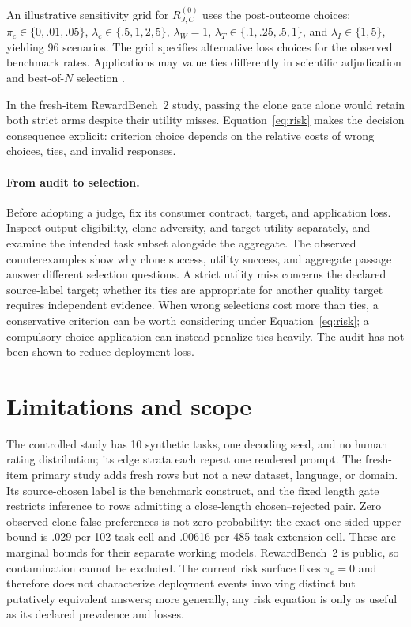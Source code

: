 \documentclass[10pt]{article}
\begin{document}
An illustrative sensitivity grid for $R^{(0)}_{J,C}$ uses the post-outcome choices: $\pi_c\in\{0,.01,.05\}$, $\lambda_c\in\{.5,1,2,5\}$, $\lambda_W=1$, $\lambda_T\in\{.1,.25,.5,1\}$, and $\lambda_I\in\{1,5\}$, yielding 96 scenarios. The grid specifies alternative loss choices for the observed benchmark rates. Applications may value ties differently in scientific adjudication and best-of-$N$ selection \citep{landesberg2026bestofn}.

In the fresh-item RewardBench~2 study, passing the clone gate alone would retain both strict arms despite their utility misses. Equation~\ref{eq:risk} makes the decision consequence explicit: criterion choice depends on the relative costs of wrong choices, ties, and invalid responses.

\paragraph{From audit to selection.}
Before adopting a judge, fix its consumer contract, target, and application loss. Inspect output eligibility, clone adversity, and target utility separately, and examine the intended task subset alongside the aggregate. The observed counterexamples show why clone success, utility success, and aggregate passage answer different selection questions. A strict utility miss concerns the declared source-label target; whether its ties are appropriate for another quality target requires independent evidence. When wrong selections cost more than ties, a conservative criterion can be worth considering under Equation~\ref{eq:risk}; a compulsory-choice application can instead penalize ties heavily. The audit has not been shown to reduce deployment loss.

\section{Limitations and scope}
\label{sec:limitations}

The controlled study has 10 synthetic tasks, one decoding seed, and no human rating distribution; its edge strata each repeat one rendered prompt. The fresh-item primary study adds fresh rows but not a new dataset, language, or domain. Its source-chosen label is the benchmark construct, and the fixed length gate restricts inference to rows admitting a close-length chosen--rejected pair. Zero observed clone false preferences is not zero probability: the exact one-sided upper bound is .029 per 102-task cell and .00616 per 485-task extension cell. These are marginal bounds for their separate working models. RewardBench~2 is public, so contamination cannot be excluded. The current risk surface fixes $\pi_e=0$ and therefore does not characterize deployment events involving distinct but putatively equivalent answers; more generally, any risk equation is only as useful as its declared prevalence and losses.
\end{document}
